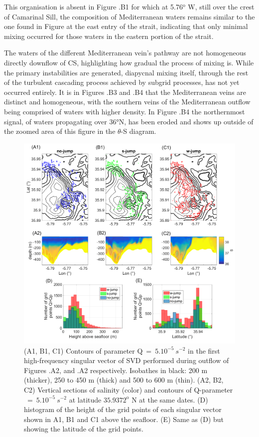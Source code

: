 This organisation is absent in Figure .B1 for which at 5.76$^{\text{o}}$ W, still over the crest of Camarinal Sill, the composition of Mediterranean waters remains similar to the one found in Figure  at the east entry of the strait, \color{red}indicating that only minimal mixing occurred for those waters in the eastern portion of the strait.\color{black}

The waters of the different Mediterranean vein's pathway are not homogeneous directly downflow of CS, highlighting how gradual the process of mixing is. While the primary instabilities are generated, diapycnal mixing itself, through the rest of the turbulent cascading process \color{red} achieved by subgrid processes\color{black}, has not yet occurred entirely. It is in Figures .B3 and .B4 that the Mediterranean veins are distinct and homogeneous, with the southern veins of the Mediterranean outflow being comprised of waters with higher density. In Figure .B4 the northernmost signal, of waters propagating  over 36°N, has been eroded and shows up outside of the zoomed area of this figure in the $\theta$-S diagram. 

\begin{figure}[!h]
 \includegraphics[width=\textwidth]{./GBR3D/EOF5_MIV_2D.png}
 \caption[SVD of parameter Q across simulations SimNT, SimIT and SimST.]{(A1, B1, C1) Contours of parameter Q$\ =\ 5.10^{-5} \ s^{-2}$ in the first high-frequency singular vector of SVD performed during outflow of Figures .A2, and .A2 respectively. Isobathes in black: 200 m (thicker), 250 to 450 m (thick) and 500 to 600 m (thin). (A2, B2, C2) Vertical sections of salinity (color) and contours of Q-parameter $\ =\ 5.10^{-5}\ s^{-2}$ at latitude $35.9372^\text{o}$ N at the same dates. (D) histogram of the height of the grid points of each singular vector shown in A1, B1 and C1 above the seafloor. (E) Same as (D) but showing the latitude of the grid points.}
 \label{FigEOFMIV}
\end{figure}


